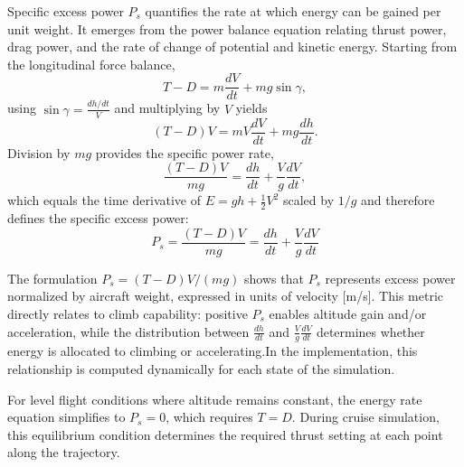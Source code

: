 Specific excess power $P_s$ quantifies the rate at which energy can be gained per unit weight. It emerges from the power balance equation relating thrust power, drag power, and the rate of change of potential and kinetic energy. Starting from the longitudinal force balance,
\begin{equation}
T - D = m\frac{dV}{dt} + mg\sin\gamma,
\end{equation}
using $\sin\gamma = \frac{dh/dt}{V}$ and multiplying by $V$ yields
\begin{equation}
(T-D)V = mV\frac{dV}{dt} + mg\frac{dh}{dt}.
\end{equation}
Division by $mg$ provides the specific power rate,
\begin{equation}
\frac{(T-D)V}{mg} = \frac{dh}{dt} + \frac{V}{g}\frac{dV}{dt},
\end{equation}
which equals the time derivative of $E = gh + \tfrac{1}{2}V^2$ scaled by $1/g$ and therefore defines the specific excess power:
\begin{equation}
P_s = \frac{(T-D)V}{mg} = \frac{dh}{dt} + \frac{V}{g}\frac{dV}{dt}
\end{equation}

The formulation $P_s = (T-D)V/(mg)$ shows that $P_s$ represents excess power normalized by aircraft weight, expressed in units of velocity [m/s]. This metric directly relates to climb capability: positive $P_s$ enables altitude gain and/or acceleration, while the distribution between $\frac{dh}{dt}$ and $\frac{V}{g}\frac{dV}{dt}$ determines whether energy is allocated to climbing or accelerating.In the implementation, this relationship is computed dynamically for each state of the simulation.

 For level flight conditions where altitude remains constant, the energy rate equation simplifies to $P_s = 0$, which requires $T = D$. During cruise simulation, this equilibrium condition determines the required thrust setting at each point along the trajectory.


